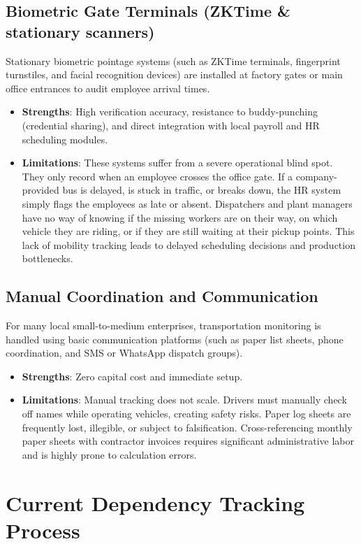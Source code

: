 \subsection{Biometric Gate Terminals (ZKTime \& stationary scanners)}
Stationary biometric pointage systems (such as ZKTime terminals, fingerprint turnstiles, and facial recognition devices) are installed at factory gates or main office entrances to audit employee arrival times.

\begin{itemize}
  \item \textbf{Strengths}: High verification accuracy, resistance to buddy-punching (credential sharing), and direct integration with local payroll and HR scheduling modules.
  \item \textbf{Limitations}: These systems suffer from a severe operational blind spot. They only record when an employee crosses the office gate. If a company-provided bus is delayed, is stuck in traffic, or breaks down, the HR system simply flags the employees as late or absent. Dispatchers and plant managers have no way of knowing if the missing workers are on their way, on which vehicle they are riding, or if they are still waiting at their pickup points. This lack of mobility tracking leads to delayed scheduling decisions and production bottlenecks.
\end{itemize}

\subsection{Manual Coordination and Communication}
For many local small-to-medium enterprises, transportation monitoring is handled using basic communication platforms (such as paper list sheets, phone coordination, and SMS or WhatsApp dispatch groups).

\begin{itemize}
  \item \textbf{Strengths}: Zero capital cost and immediate setup.
  \item \textbf{Limitations}: Manual tracking does not scale. Drivers must manually check off names while operating vehicles, creating safety risks. Paper log sheets are frequently lost, illegible, or subject to falsification. Cross-referencing monthly paper sheets with contractor invoices requires significant administrative labor and is highly prone to calculation errors.
\end{itemize}

\section{Current Dependency Tracking Process}

